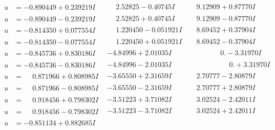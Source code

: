 \documentclass[1p]{elsarticle_modified}
\theoremstyle{definition}
\begin{document}
$$\begin{array}{c|c|c}
\begin{aligned}
u &= -0.890449 + 0.239219 I\end{aligned}
 & \phantom{-}2.52825 - 0.40745 I & \phantom{-}9.12909 + 0.87770 I \\ \hline\begin{aligned}
u &= -0.890449 - 0.239219 I\end{aligned}
 & \phantom{-}2.52825 + 0.40745 I & \phantom{-}9.12909 - 0.87770 I \\ \hline\begin{aligned}
u &= -0.814350 + 0.077554 I\end{aligned}
 & \phantom{-}1.220450 - 0.051921 I & \phantom{-}8.69452 + 0.37904 I \\ \hline\begin{aligned}
u &= -0.814350 - 0.077554 I\end{aligned}
 & \phantom{-}1.220450 + 0.051921 I & \phantom{-}8.69452 - 0.37904 I \\ \hline\begin{aligned}
u &= -0.845736 + 0.830186 I\end{aligned}
 & -4.84996 + 2.01035 I & \phantom{-0.000000 } 0. - 3.31970 I \\ \hline\begin{aligned}
u &= -0.845736 - 0.830186 I\end{aligned}
 & -4.84996 - 2.01035 I & \phantom{-0.000000 -}0. + 3.31970 I \\ \hline\begin{aligned}
u &= \phantom{-}0.871966 + 0.808985 I\end{aligned}
 & -3.65550 + 2.31659 I & \phantom{-}2.70777 - 2.80879 I \\ \hline\begin{aligned}
u &= \phantom{-}0.871966 - 0.808985 I\end{aligned}
 & -3.65550 - 2.31659 I & \phantom{-}2.70777 + 2.80879 I \\ \hline\begin{aligned}
u &= \phantom{-}0.918456 + 0.798302 I\end{aligned}
 & -3.51223 + 3.71082 I & \phantom{-}3.02524 - 2.42011 I \\ \hline\begin{aligned}
u &= \phantom{-}0.918456 - 0.798302 I\end{aligned}
 & -3.51223 - 3.71082 I & \phantom{-}3.02524 + 2.42011 I \\ \hline\begin{aligned}
u &= -0.851134 + 0.882685 I\end{aligned}

\end{array}$$
\end{document}
